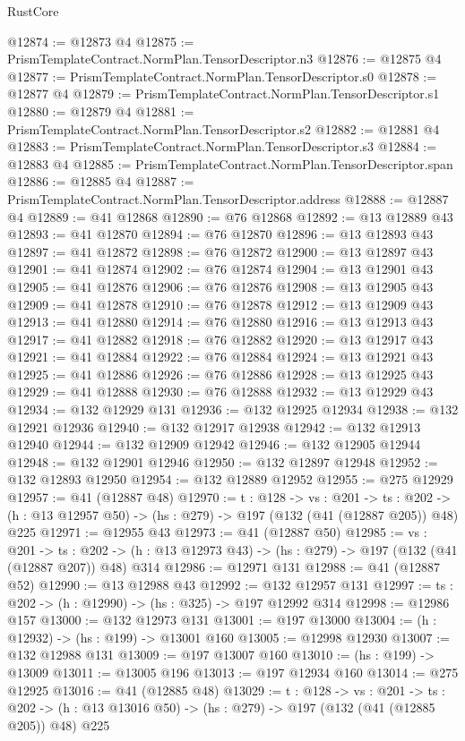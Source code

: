 \begin{lexlean}{RustCore}
\begin{coremodule}
@12874 := @12873 @4
@12875 := PrismTemplateContract.NormPlan.TensorDescriptor.n3
@12876 := @12875 @4
@12877 := PrismTemplateContract.NormPlan.TensorDescriptor.s0
@12878 := @12877 @4
@12879 := PrismTemplateContract.NormPlan.TensorDescriptor.s1
@12880 := @12879 @4
@12881 := PrismTemplateContract.NormPlan.TensorDescriptor.s2
@12882 := @12881 @4
@12883 := PrismTemplateContract.NormPlan.TensorDescriptor.s3
@12884 := @12883 @4
@12885 := PrismTemplateContract.NormPlan.TensorDescriptor.span
@12886 := @12885 @4
@12887 := PrismTemplateContract.NormPlan.TensorDescriptor.address
@12888 := @12887 @4
@12889 := @41 @12868
@12890 := @76 @12868
@12892 := @13 @12889 @43
@12893 := @41 @12870
@12894 := @76 @12870
@12896 := @13 @12893 @43
@12897 := @41 @12872
@12898 := @76 @12872
@12900 := @13 @12897 @43
@12901 := @41 @12874
@12902 := @76 @12874
@12904 := @13 @12901 @43
@12905 := @41 @12876
@12906 := @76 @12876
@12908 := @13 @12905 @43
@12909 := @41 @12878
@12910 := @76 @12878
@12912 := @13 @12909 @43
@12913 := @41 @12880
@12914 := @76 @12880
@12916 := @13 @12913 @43
@12917 := @41 @12882
@12918 := @76 @12882
@12920 := @13 @12917 @43
@12921 := @41 @12884
@12922 := @76 @12884
@12924 := @13 @12921 @43
@12925 := @41 @12886
@12926 := @76 @12886
@12928 := @13 @12925 @43
@12929 := @41 @12888
@12930 := @76 @12888
@12932 := @13 @12929 @43
@12934 := @132 @12929 @131
@12936 := @132 @12925 @12934
@12938 := @132 @12921 @12936
@12940 := @132 @12917 @12938
@12942 := @132 @12913 @12940
@12944 := @132 @12909 @12942
@12946 := @132 @12905 @12944
@12948 := @132 @12901 @12946
@12950 := @132 @12897 @12948
@12952 := @132 @12893 @12950
@12954 := @132 @12889 @12952
@12955 := @275 @12929
@12957 := @41 (@12887 @48)
@12970 := {t : @128} ->
  {vs : @201} ->
  {ts : @202} -> (h : @13 @12957 @50) -> (hs : @279) -> @197 (@132 (@41 (@12887 @205)) @48) @225
@12971 := @12955 @43
@12973 := @41 (@12887 @50)
@12985 := {vs : @201} ->
  {ts : @202} -> (h : @13 @12973 @43) -> (hs : @279) -> @197 (@132 (@41 (@12887 @207)) @48) @314
@12986 := @12971 @131
@12988 := @41 (@12887 @52)
@12990 := @13 @12988 @43
@12992 := @132 @12957 @131
@12997 := {ts : @202} -> (h : @12990) -> (hs : @325) -> @197 @12992 @314
@12998 := @12986 @157
@13000 := @132 @12973 @131
@13001 := @197 @13000
@13004 := (h : @12932) -> (hs : @199) -> @13001 @160
@13005 := @12998 @12930
@13007 := @132 @12988 @131
@13009 := @197 @13007 @160
@13010 := (hs : @199) -> @13009
@13011 := @13005 @196
@13013 := @197 @12934 @160
@13014 := @275 @12925
@13016 := @41 (@12885 @48)
@13029 := {t : @128} ->
  {vs : @201} ->
  {ts : @202} -> (h : @13 @13016 @50) -> (hs : @279) -> @197 (@132 (@41 (@12885 @205)) @48) @225

\end{coremodule}
\end{lexlean}
